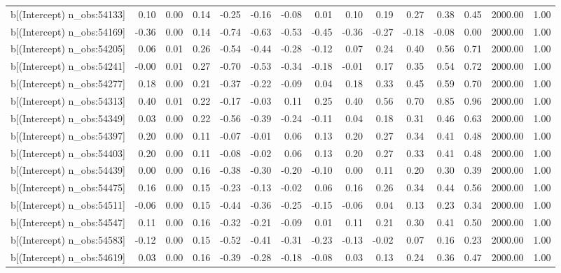 \begin{table}[ht]
\begin{tabular}{rrrrrrrrrrrrrrr}
  b[(Intercept) n\_obs:54133] & 0.10 & 0.00 & 0.14 & -0.25 & -0.16 & -0.08 & 0.01 & 0.10 & 0.19 & 0.27 & 0.38 & 0.45 & 2000.00 & 1.00 \\ 
  b[(Intercept) n\_obs:54169] & -0.36 & 0.00 & 0.14 & -0.74 & -0.63 & -0.53 & -0.45 & -0.36 & -0.27 & -0.18 & -0.08 & 0.00 & 2000.00 & 1.00 \\ 
  b[(Intercept) n\_obs:54205] & 0.06 & 0.01 & 0.26 & -0.54 & -0.44 & -0.28 & -0.12 & 0.07 & 0.24 & 0.40 & 0.56 & 0.71 & 2000.00 & 1.00 \\ 
  b[(Intercept) n\_obs:54241] & -0.00 & 0.01 & 0.27 & -0.70 & -0.53 & -0.34 & -0.18 & -0.01 & 0.17 & 0.35 & 0.54 & 0.72 & 2000.00 & 1.00 \\ 
  b[(Intercept) n\_obs:54277] & 0.18 & 0.00 & 0.21 & -0.37 & -0.22 & -0.09 & 0.04 & 0.18 & 0.33 & 0.45 & 0.59 & 0.70 & 2000.00 & 1.00 \\ 
  b[(Intercept) n\_obs:54313] & 0.40 & 0.01 & 0.22 & -0.17 & -0.03 & 0.11 & 0.25 & 0.40 & 0.56 & 0.70 & 0.85 & 0.96 & 2000.00 & 1.00 \\ 
  b[(Intercept) n\_obs:54349] & 0.03 & 0.00 & 0.22 & -0.56 & -0.39 & -0.24 & -0.11 & 0.04 & 0.18 & 0.31 & 0.46 & 0.63 & 2000.00 & 1.00 \\ 
  b[(Intercept) n\_obs:54397] & 0.20 & 0.00 & 0.11 & -0.07 & -0.01 & 0.06 & 0.13 & 0.20 & 0.27 & 0.34 & 0.41 & 0.48 & 2000.00 & 1.00 \\ 
  b[(Intercept) n\_obs:54403] & 0.20 & 0.00 & 0.11 & -0.08 & -0.02 & 0.06 & 0.13 & 0.20 & 0.27 & 0.33 & 0.41 & 0.48 & 2000.00 & 1.00 \\ 
  b[(Intercept) n\_obs:54439] & 0.00 & 0.00 & 0.16 & -0.38 & -0.30 & -0.20 & -0.10 & 0.00 & 0.11 & 0.20 & 0.30 & 0.39 & 2000.00 & 1.00 \\ 
  b[(Intercept) n\_obs:54475] & 0.16 & 0.00 & 0.15 & -0.23 & -0.13 & -0.02 & 0.06 & 0.16 & 0.26 & 0.34 & 0.44 & 0.56 & 2000.00 & 1.00 \\ 
  b[(Intercept) n\_obs:54511] & -0.06 & 0.00 & 0.15 & -0.44 & -0.36 & -0.25 & -0.15 & -0.06 & 0.04 & 0.13 & 0.23 & 0.34 & 2000.00 & 1.00 \\ 
  b[(Intercept) n\_obs:54547] & 0.11 & 0.00 & 0.16 & -0.32 & -0.21 & -0.09 & 0.01 & 0.11 & 0.21 & 0.30 & 0.41 & 0.50 & 2000.00 & 1.00 \\ 
  b[(Intercept) n\_obs:54583] & -0.12 & 0.00 & 0.15 & -0.52 & -0.41 & -0.31 & -0.23 & -0.13 & -0.02 & 0.07 & 0.16 & 0.23 & 2000.00 & 1.00 \\ 
  b[(Intercept) n\_obs:54619] & 0.03 & 0.00 & 0.16 & -0.39 & -0.28 & -0.18 & -0.08 & 0.03 & 0.13 & 0.24 & 0.36 & 0.47 & 2000.00 & 1.00 \\ 

\end{tabular}
\end{table}
